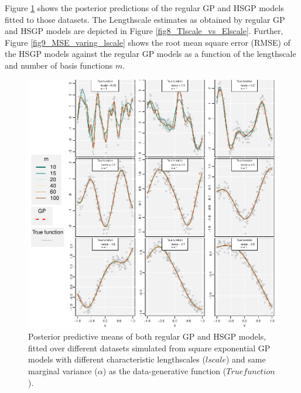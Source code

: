 \documentclass[]{interact}
\theoremstyle{plain}%
\theoremstyle{definition}
\theoremstyle{remark}
\begin{document}
Figure \ref{fig7_varing_lscale} shows the posterior predictions of the regular GP and HSGP models fitted to those datasets. The Lengthscale estimates as obtained by regular GP and HSGP models are depicted in Figure \ref{fig8_Tlscale_vs_Elscale}. Further, Figure \ref{fig9_MSE_varing_lscale} shows the root mean square error (RMSE) of the HSGP models against the regular GP models as a function of the lengthscale and number of basis functions $m$.

\begin{figure}
\centering
\includegraphics[width=\textwidth]{fig7_varing_lscale.pdf}
\caption{Posterior predictive means of both regular GP and HSGP models, fitted over different datasets simulated from square exponential GP models with different characteristic lengthscales ($lscale$) and same marginal variance ($\alpha$) as the data-generative function ($True function$).}
  \label{fig7_varing_lscale}
\end{figure}
\end{document}
